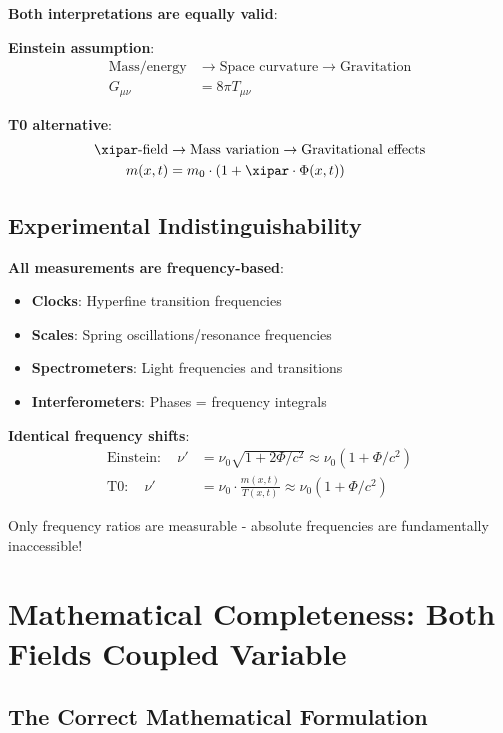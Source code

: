 	\textbf{Both interpretations are equally valid}:
	
	\textbf{Einstein assumption}:
	\begin{align}
		\text{Mass/energy} &\rightarrow \text{Space curvature} \rightarrow \text{Gravitation} \\
		G_{\mu\nu} &= 8\pi T_{\mu\nu}
	\end{align}
	
	\textbf{T0 alternative}:
	\begin{align}
		\xipar\text{-field} &\rightarrow \text{Mass variation} \rightarrow \text{Gravitational effects} \\
		m(x,t) &= m_0 \cdot (1 + \xipar \cdot \Phi(x,t))
	\end{align}
	
	\subsection{Experimental Indistinguishability}
	
	\textbf{All measurements are frequency-based}:
	\begin{itemize}
		\item \textbf{Clocks}: Hyperfine transition frequencies
		\item \textbf{Scales}: Spring oscillations/resonance frequencies
		\item \textbf{Spectrometers}: Light frequencies and transitions
		\item \textbf{Interferometers}: Phases = frequency integrals
	\end{itemize}
	
	\textbf{Identical frequency shifts}:
	\begin{align}
		\text{Einstein}: \quad \nu' &= \nu_0 \sqrt{1 + 2\Phi/c^2} \approx \nu_0 (1 + \Phi/c^2) \\
		\text{T0}: \quad \nu' &= \nu_0 \cdot \frac{m(x,t)}{T(x,t)} \approx \nu_0 (1 + \Phi/c^2)
	\end{align}
	
	Only frequency ratios are measurable - absolute frequencies are fundamentally inaccessible!
	
	\section{Mathematical Completeness: Both Fields Coupled Variable}
	
	\subsection{The Correct Mathematical Formulation}
	
